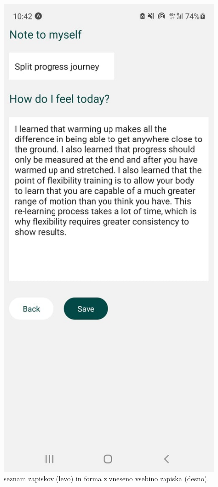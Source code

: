 \documentclass[a4paper, 12pt]{book}
\begin{document}
\begin{figure}[!htbp]
\begin{minipage}[b]{0.41\textwidth}
  \end{minipage}
  \begin{minipage}[b]{0.41\textwidth}
    \includegraphics[width=\textwidth]{ustvarjanjezapiska.jpg}\centering
  \end{minipage}
    \caption{seznam zapiskov (levo) in forma z vneseno vsebino zapiska (desno).}
    \label{zapiski1}
\end{figure}
\end{document}
